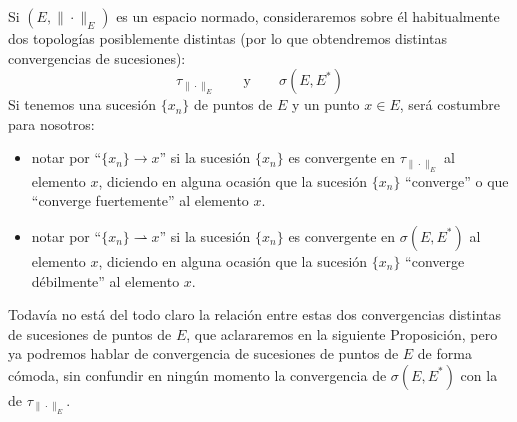 \begin{notacion}
    Si $(E,\|\cdot \|_E)$ es un espacio normado, consideraremos sobre él habitualmente dos topologías posiblemente distintas (por lo que obtendremos distintas convergencias de sucesiones):
    \begin{equation*}
        \tau_{\|\cdot \|_E} \qquad \text{y}\qquad \sigma(E,E^\ast)
    \end{equation*}
    Si tenemos una sucesión $\{x_n\}$ de puntos de $E$ y un punto $x\in E$, será costumbre para nosotros:
    \begin{itemize}
        \item notar por ``$\{x_n\}\to x$'' si la sucesión $\{x_n\}$ es convergente en $\tau_{\|\cdot \|_E}$ al elemento $x$, diciendo en alguna ocasión que la sucesión $\{x_n\}$ ``converge'' o que ``converge fuertemente'' al elemento $x$.
        \item notar por ``$\{x_n\}\rightharpoonup x$'' si la sucesión $\{x_n\}$ es convergente en $\sigma(E,E^\ast)$ al elemento $x$, diciendo en alguna ocasión que la sucesión $\{x_n\}$ ``converge débilmente'' al elemento $x$.
    \end{itemize}
    Todavía no está del todo claro la relación entre estas dos convergencias distintas de sucesiones de puntos de $E$, que aclararemos en la siguiente Proposición, pero ya podremos hablar de convergencia de sucesiones de puntos de $E$ de forma cómoda, sin confundir en ningún momento la convergencia de $\sigma(E,E^\ast)$ con la de $\tau_{\|\cdot \|_E}$.
\end{notacion}

